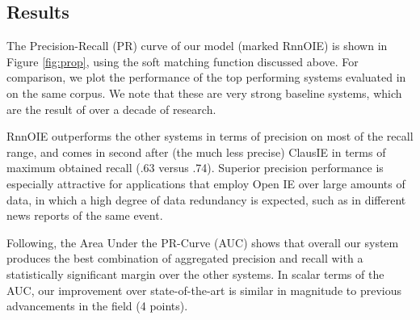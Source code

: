 \subsection{Results}



 


%

The Precision-Recall (PR) curve of our model (marked RnnOIE) is shown in Figure \ref{fig:prop},
using the soft matching function discussed above.
For comparison, we plot the performance of the top performing systems evaluated in \cite{Stanovsky2016EMNLP} on the same corpus. We note that these are very strong baseline systems, which are the result of over a decade of research.

RnnOIE outperforms the other systems in terms of precision on most of the recall range, and comes in second after (the much less precise) ClausIE in terms of maximum obtained recall (.63 versus .74).
Superior precision performance is especially attractive for
applications that employ Open IE over large amounts of data, in which a high degree of data redundancy is expected, such as in different news reports of the same event.

Following, the Area Under the PR-Curve (AUC) shows that overall our system
produces the best combination of aggregated precision and recall with a statistically significant margin over
the other systems. In scalar terms of the AUC, our improvement over state-of-the-art is similar in magnitude to previous
advancements in the field (4 points).




